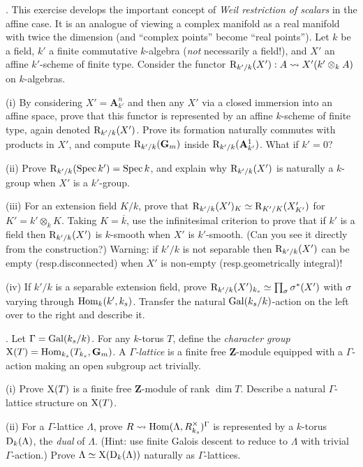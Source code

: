 \documentclass[10pt]{amsart}
\def\Spec{\mathop{\rm Spec}}
\begin{document}
\medskip{}.  This exercise develops the important concept of {\em Weil restriction of scalars} in the affine
case.  It is an analogue
of viewing a complex manifold as a real manifold with twice the dimension (and ``complex points''
become ``real points'').  Let $k$ be a field, $k'$ a finite commutative
$k$-algebra ({\em not} necessarily a field!), and $X'$ an affine $k'$-scheme of finite
type.  Consider the functor ${\rm{R}}_{k'/k}(X'):A \rightsquigarrow X'(k' \otimes_k A)$ on $k$-algebras. 

(i) By considering $X' = \mathbf{A}^n_{k'}$ and then any $X'$ via a closed
immersion into an affine space, prove that this functor is represented by an affine
$k$-scheme of finite type, again denoted ${\rm{R}}_{k'/k}(X')$.  Prove its formation
naturally commutes with products in $X'$, and compute
${\rm{R}}_{k'/k}(\mathbf{G}_m)$ inside ${\rm{R}}_{k'/k}(\mathbf{A}^1_{k'})$.  What if $k' = 0$?  


(ii) Prove ${\rm{R}}_{k'/k}(\Spec k') = \Spec k$, and explain why ${\rm{R}}_{k'/k}(X')$ is naturally
a $k$-group when $X'$ is a $k'$-group.  

(iii) For an extension field $K/k$, prove that ${\rm{R}}_{k'/k}(X')_K \simeq
{\rm{R}}_{K'/K}(X'_{K'})$ for $K' = k' \otimes_k K$.  Taking $K = \overline{k}$, use the infinitesimal
criterion to prove that if $k'$ is a field then ${\rm{R}}_{k'/k}(X')$ is $k$-smooth when $X'$ is $k'$-smooth.  
(Can you see it directly from the construction?)   Warning: if $k'/k$ is not separable then
${\rm{R}}_{k'/k}(X')$ can be empty (resp.\:disconnected) when $X'$ is non-empty (resp.\:geometrically
integral)!

(iv) If $k'/k$ is a separable extension field, prove 
${\rm{R}}_{k'/k}(X')_{k_s} \simeq \prod_{\sigma} \sigma^{\ast}(X')$ with $\sigma$ varying through
${\rm{Hom}}_k(k', k_s)$.   Transfer the natural
${\rm{Gal}}(k_s/k)$-action on the left over to the right and describe it. 

\medskip{}.  Let $\Gamma = {\rm{Gal}}(k_s/k)$.
For any $k$-torus $T$, define the {\em character group}
${\rm{X}}(T) = {\rm{Hom}}_{k_s}(T_{k_s}, \mathbf{G}_m)$.
A {\em $\Gamma$-lattice} is a finite
free $\mathbf{Z}$-module equipped with a $\Gamma$-action making an open subgroup act trivially. 

(i) Prove ${\rm{X}}(T)$ is a finite free $\mathbf{Z}$-module of rank $\dim T$.  Describe a natural
$\Gamma$-lattice structure on ${\rm{X}}(T)$. 

(ii) For a $\Gamma$-lattice $\Lambda$, prove
$R \rightsquigarrow {\rm{Hom}}(\Lambda, R_{k_s}^{\times})^{\Gamma}$
is represented by a $k$-torus ${\rm{D}}_k(\Lambda)$, the
{\em dual} of $\Lambda$.   (Hint: use finite Galois descent to reduce
to $\Lambda$ with trivial $\Gamma$-action.) Prove
$\Lambda \simeq {\rm{X}}({\rm{D}}_k(\Lambda))$ naturally as $\Gamma$-lattices.
\end{document}
